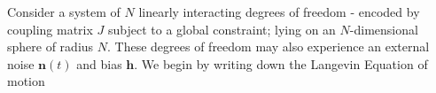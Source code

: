 Consider a system of $N$ linearly interacting degrees of freedom - encoded by coupling matrix $J$ subject to a global constraint; lying on an $N$-dimensional sphere of radius $N$. These degrees of freedom may also experience an external noise $\mathbf{n}(t)$ and bias $\mathbf{h}$. We begin by writing down the Langevin Equation of motion